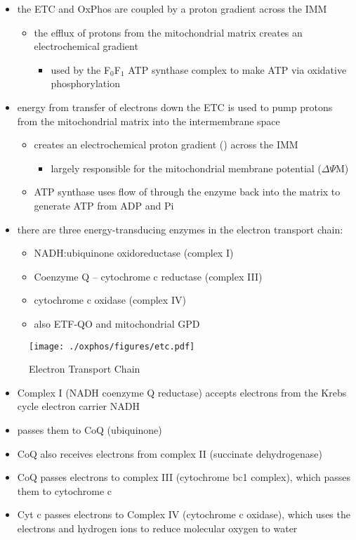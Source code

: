 \documentclass{scrartcl}
\begin{document}
\begin{itemize}
\item the ETC and OxPhos are coupled by a proton gradient across the IMM
\begin{itemize}
\item the efflux of protons from the mitochondrial matrix creates an electrochemical gradient
\begin{itemize}
\item used by the F\(_{\text{0}}\)F\(_{\text{1}}\) ATP synthase complex to make ATP via oxidative phosphorylation
\end{itemize}
\end{itemize}
\item energy from transfer of electrons down the ETC is used to pump
protons from the mitochondrial matrix into the intermembrane space
\begin{itemize}
\item creates an electrochemical proton gradient (\DeltapH) across the IMM
\begin{itemize}
\item largely responsible for the mitochondrial membrane potential (\(\Delta \Psi\)M)
\end{itemize}
\item ATP synthase uses flow of  through the enzyme back into the
matrix to generate ATP from ADP and Pi
\end{itemize}
\item there are three energy-transducing enzymes in the electron transport
chain:
\begin{itemize}
\item NADH:ubiquinone oxidoreductase (complex I)
\item Coenzyme Q – cytochrome c reductase (complex III)
\item cytochrome c oxidase (complex IV)
\item also ETF-QO and mitochondrial GPD
\end{itemize}
\end{itemize}

\begin{figure}[htbp]
\centering
\texttt{[image: ./oxphos/figures/etc.pdf]}
\caption{\label{fig:org5f3dced}
Electron Transport Chain}
\end{figure}

\begin{itemize}
\item Complex I (NADH coenzyme Q reductase) accepts electrons from the
Krebs cycle electron carrier NADH
\item passes them to CoQ (ubiquinone)
\item CoQ also receives electrons from complex II (succinate dehydrogenase)
\item CoQ passes electrons to complex III (cytochrome bc1 complex), which
passes them to cytochrome c
\item Cyt c passes electrons to Complex IV (cytochrome c oxidase), which
uses the electrons and hydrogen ions to reduce molecular oxygen to
water
\end{itemize}
\end{document}
